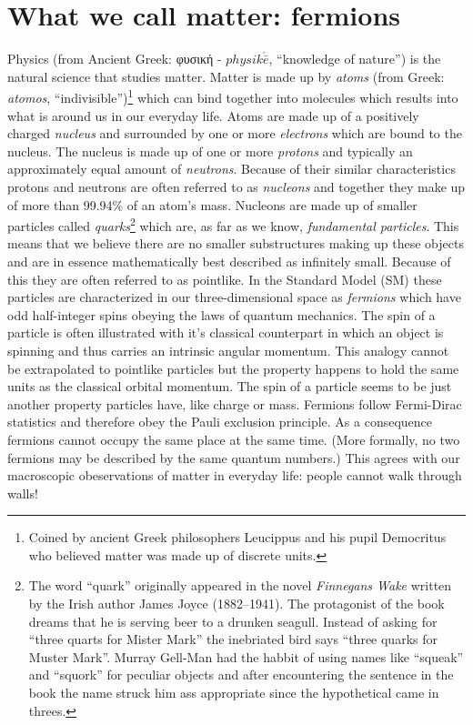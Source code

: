 \section{What we call matter: fermions}
\label{sec:fermions}
Physics (from Ancient Greek: \gr φυσική \en - $physik\acute{\bar{e}}$, ``knowledge of nature'') is the natural science that studies matter.
Matter is made up by \textit{atoms} (from Greek: \textit{atomos}, ``indivisible'')\footnote{Coined by ancient Greek philosophers Leucippus and his pupil Democritus who believed matter was made up of discrete units.} which can bind together into molecules which results into what is around us in our everyday life.
Atoms are made up of a positively charged \textit{nucleus} and surrounded by one or more \textit{electrons} which are bound to the nucleus.
The nucleus is made up of one or more \textit{protons} and typically an approximately equal amount of \textit{neutrons}. Because of their similar characteristics protons and neutrons are often referred to as \textit{nucleons} and together they make up of more than 99.94\% of an atom's mass.
Nucleons are made up of smaller particles called \textit{quarks}\footnote{The word ``quark'' originally appeared in the novel \textit{Finnegans Wake} written by the Irish author James Joyce (1882–1941). The protagonist of the book dreams that he is serving beer to a drunken seagull. Instead of asking for ``three quarts for Mister Mark'' the inebriated bird says ``three quarks for Muster Mark''. Murray Gell-Man had the habbit of using names like ``squeak'' and ``squork'' for peculiar objects and after encountering the sentence in the book the name struck him ass appropriate since the hypothetical came in threes.} which are, as far as we know, \textit{fundamental particles}. This means that we believe there are no smaller substructures making up these objects and are in essence mathematically best described as infinitely small.
Because of this they are often referred to as pointlike.
In the Standard Model (SM) these particles are characterized in our three-dimensional space as \textit{fermions} which have odd half-integer spins obeying the laws of quantum mechanics.
The spin of a particle is often illustrated with it's classical counterpart in which an object is spinning and thus carries an intrinsic angular momentum.
This analogy cannot be extrapolated to pointlike particles but the property happens to hold the same units as the classical orbital momentum.
The spin of a particle seems to be just another property particles have, like charge or mass.
Fermions follow Fermi-Dirac statistics and therefore obey the Pauli exclusion principle. As a consequence fermions cannot occupy the same place at the same time. (More formally, no two fermions may be described by the same quantum numbers.) This agrees with our macroscopic obeservations of matter in everyday life: people cannot walk through walls!

